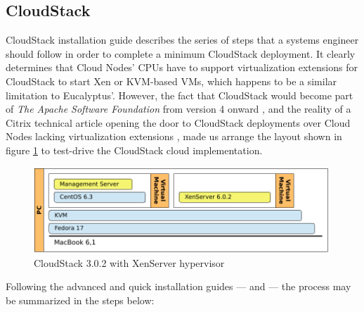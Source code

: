 \subsection{CloudStack}\label{subsec:cloudstack}

\noindent CloudStack installation guide \cite{cloudstackquickinstall} describes the series of steps that a systems engineer should follow in order to complete a minimum CloudStack deployment. It clearly determines that Cloud Nodes' CPUs have to support virtualization extensions for CloudStack to start Xen or KVM-based VMs, which happens to be a similar limitation to Eucalyptus'. However, the fact that CloudStack would become part of \emph{The Apache Software Foundation} from version 4 onward \cite{cloudstackstrategy}, and the reality of a Citrix technical article opening the door to CloudStack deployments over Cloud Nodes lacking virtualization extensions \cite{apachecloudstack4}, made us arrange the layout shown in figure \ref{fig:cloudstack} to test-drive the CloudStack cloud implementation.

\begin{figure}[tbp]
\begin{center}
\includegraphics[width=0.99\textwidth]{imagenes/008.pdf}
 \caption{CloudStack 3.0.2 with XenServer hypervisor}
\label{fig:cloudstack}
\end{center}
\end{figure}

Following the advanced and quick installation guides --- \cite{cloudstackquickinstall} and \cite{cloudstackadvinstall} --- the process may be summarized in the steps below:

